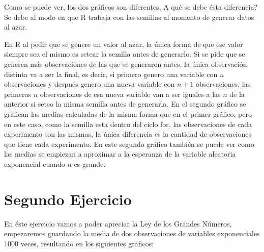 \documentclass[a4paper]{article}
\begin{document}
	Como se puede ver, los dos gr\'aficos son diferentes, \textquestiondown A qu\'e se debe \'esta diferencia? Se debe al modo en que R trabaja con las semillas al momento de generar datos al azar.
	
	En R al pedir que se genere un valor al azar, la \'unica forma de que ese valor siempre sea el mismo es setear la semilla antes de generarlo. Si se pide que se generen m\'as observaciones de las que se generaron antes, la \'unica observaci\'on distinta va a ser la final, es decir, si primero genero una variable con $n$ observaciones y despu\'es genero una nueva variable con $n+1$ observaciones, las primeras $n$ observaciones de esa nueva variable van a ser iguales a las $n$ de la anterior si seteo la misma semilla antes de generarla.
	En el segundo gr\'afico se grafican las medias calculadas de la misma forma que en el primer gr\'afico, pero en este caso, como la semilla esta dentro del ciclo for, las observaciones de cada experimento son las mismas, la \'unica diferencia es la cantidad de observaciones que tiene cada experimento.
	En este segundo gr\'afico tambi\'en se puede ver como las medias se empiezan a aproximar a la esperanza de la variable aleatoria exponencial cuando $n$ es grande.
	\newpage
	
	\section{Segundo Ejercicio}
	
	En \'este ejercicio vamos a poder apreciar la Ley de los Grandes N\'umeros, empezaremos guardando la media de dos observaciones de variables exponenciales 1000 veces, resultando en los siguientes gr\'aficos:
	
\end{document}
